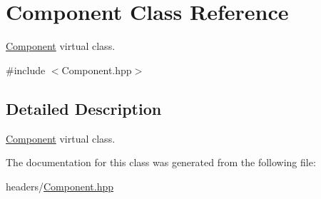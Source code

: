 \hypertarget{class_component}{}\section{Component Class Reference}
\label{class_component}


\mbox{\hyperlink{class_component}{Component}} virtual class.  




{\ttfamily \#include $<$Component.\+hpp$>$}



\subsection{Detailed Description}
\mbox{\hyperlink{class_component}{Component}} virtual class. 

The documentation for this class was generated from the following file\+:\begin{DoxyCompactItemize}
\item 
headers/\mbox{\hyperlink{_component_8hpp}{Component.\+hpp}}\end{DoxyCompactItemize}
